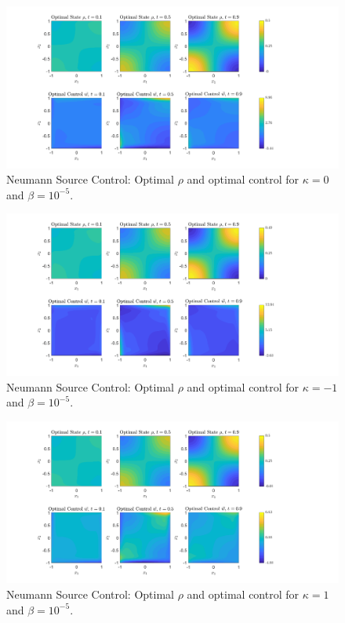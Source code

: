 \documentclass[11pt, a4paper]{article}
\theoremstyle{definition}
\begin{document}
	\begin{figure}[h]
		\centering
		\includegraphics[scale=0.35]{SCEx1k0b5.png}
		\caption{Neumann Source Control: Optimal $\rho$ and optimal control for $\kappa = 0$ and $\beta = 10^{-5}$.} 
		\label{F1a5}
	\end{figure}
	\begin{figure}[h]
		\centering
		\includegraphics[scale=0.35]{SCEx1kn1b5.png}
		\caption{Neumann Source Control: Optimal $\rho$ and optimal control for $\kappa = -1$ and $\beta = 10^{-5}$.} 
		\label{F1b5}
	\end{figure}
	\begin{figure}[h]
		\centering
		\includegraphics[scale=0.35]{SCEx1k1b5.png}
		\caption{Neumann Source Control: Optimal $\rho$ and optimal control for $\kappa = 1$ and $\beta = 10^{-5}$.} 
		\label{F1c5}
	\end{figure}
\end{document}
